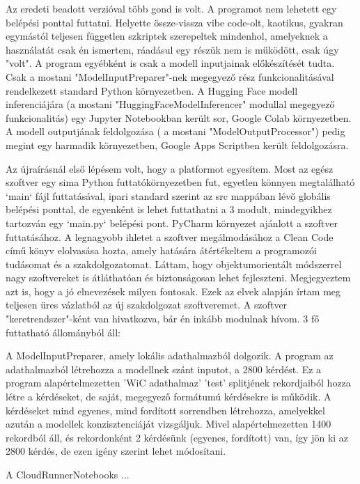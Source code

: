 \documentclass[12pt]{report}
\theoremstyle{definition}
\begin{document}
                         Az eredeti beadott verzióval több gond is volt. A programot nem lehetett egy belépési ponttal futtatni. Helyette össze-vissza vibe code-olt, kaotikus, gyakran egymástól teljesen független szkriptek szerepeltek mindenhol, amelyeknek a használatát csak én ismertem, ráadásul egy részük nem is működött, csak úgy "volt". A program egyébként is csak a modell inputjainak előkészítését tudta. Csak a mostani "ModelInputPreparer"-nek megegyező rész funkcionalitásával rendelkezett standard Python környezetben. A Hugging Face modell inferenciájára (a mostani "HuggingFaceModelInferencer" modullal megegyező funkcionalitás) egy Jupyter Notebookban került sor, Google Colab környezetben. A modell outputjának feldolgozása ( a mostani "ModelOutputProcessor") pedig megint egy harmadik környezetben, Google Apps Scriptben került feldolgozásra.

                         Az újraírásnál első lépésem volt, hogy a platformot egyesítem. Most az egész szoftver egy sima Python futtatókörnyezetben fut, egyetlen könnyen megtalálható `main` fájl futtatásával, ipari standard szerint az src mappában lévő globális belépési ponttal, de egyenként is lehet futtathatni a 3 modult, mindegyikhez tartozván egy `main.py` belépési pont. PyCharm környezet ajánlott a szoftver futtatásához. A legnagyobb ihletet a szoftver megálmodásához a Clean Code című könyv elolvasása hozta, amely hatására átértékeltem a programozói tudásomat és a szakdolgozatomat. Láttam, hogy objektumorientált módszerrel nagy szoftvereket is átláthatóan és biztonságosan lehet fejleszteni. Megjegyeztem azt is, hogy a jó elnevezések milyen fontosak. Ezek az elvek alapján írtam meg teljesen üres vázlatból az új szakdolgozat szoftveremet. A szoftver "keretrendszer"-ként van hivatkozva, bár én inkább modulnak hívom. 3 fő futtatható állományból áll:

                         A ModelInputPreparer, amely lokális adathalmazból dolgozik. A program az adathalmazból létrehozza a modellnek szánt inputot, a 2800 kérdést. Ez a program alapértelmezetten 'WiC adathalmaz' 'test' splitjének rekordjaiból hozza létre a kérdéseket, de saját, megegyező formátumú kérdésekre is működik. A kérdéseket mind egyenes, mind fordított sorrendben létrehozza, amelyekkel azután a modellek konzisztenciáját vizsgáljuk. Mivel alapértelmezetten 1400 rekordból áll, és rekordonként 2 kérdésünk (egyenes, fordított) van, így jön ki az 2800 kérdés, de ezen igény szerint lehet módosítani.

                         A CloudRunnerNotebooks ...
\end{document}
